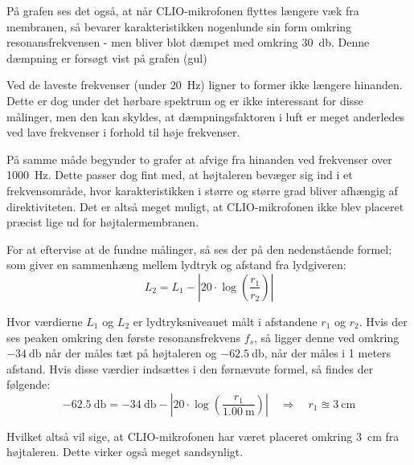 På grafen ses det også, at når CLIO-mikrofonen flyttes længere væk fra membranen, så bevarer karakteristikken nogenlunde sin form omkring resonansfrekvensen - men bliver blot dæmpet med omkring \SI{30}{\decibel}. Denne dæmpning er forsøgt vist på grafen (gul)

Ved de laveste frekvenser (under \SI{20}{\hertz}) ligner to former ikke længere hinanden. Dette er dog under det hørbare spektrum og er ikke interessant for disse målinger, men den kan skyldes, at dæmpningsfaktoren i luft er meget anderledes ved lave frekvenser i forhold til høje frekvenser.

På samme måde begynder to grafer at afvige fra hinanden ved frekvenser over \SI{1000}{\hertz}. Dette passer dog fint med, at højtaleren bevæger sig ind i et frekvensområde, hvor karakteristikken i større og større grad bliver afhængig af direktiviteten. Det er altså meget muligt, at CLIO-mikrofonen ikke blev placeret præcist lige ud for højtalermembranen.

For at eftervise at de fundne målinger, så ses der på den nedenstående formel; som giver en sammenhæng mellem lydtryk og afstand fra lydgiveren:
\begin{equation}
L_2 = L_1 - \left| 20 \cdot \log \left( \frac{r_1}{r_2} \right) \right|
\end{equation}

Hvor værdierne $L_1$ og $L_2$ er lydtryksniveauet målt i afstandene $r_1$ og $r_2$. Hvis der ses peaken omkring den første resonansfrekvens $f_s$, så ligger denne ved omkring $-\SI{34}{\decibel}$ når der måles tæt på højtaleren og $-\SI{62.5}{\decibel}$, når der måles i 1 meters afstand. Hvis disse værdier indsættes i den førnævnte formel, så findes der følgende:
\begin{equation}
\SI{-62.5}{\decibel} = \SI{-34}{\decibel} - \left| 20 \cdot \log \left( \frac{r_1}{\SI{1.00}{\meter}} \right)\right| \quad \Rightarrow \quad r_1 \approxeq \SI{3}{\centi\meter}
\end{equation}

Hvilket altså vil sige, at CLIO-mikrofonen har været placeret omkring \SI{3}{\centi\meter} fra højtaleren. Dette virker også meget sandsynligt.